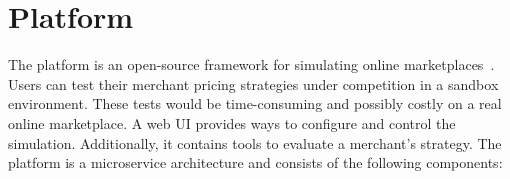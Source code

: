 
\chapter{\pricewars Platform}

The \pricewars platform is an open-source framework for simulating online marketplaces~\cite{DBLP:conf/recsys/0001SPSBLLSU17, edoc2017pricewars}.
Users can test their merchant pricing strategies under competition in a sandbox environment.
These tests would be time-consuming and possibly costly on a real online marketplace.
A web UI provides ways to configure and control the simulation.
Additionally, it contains tools to evaluate a merchant's strategy.
The platform is a microservice architecture and consists of the following components:



